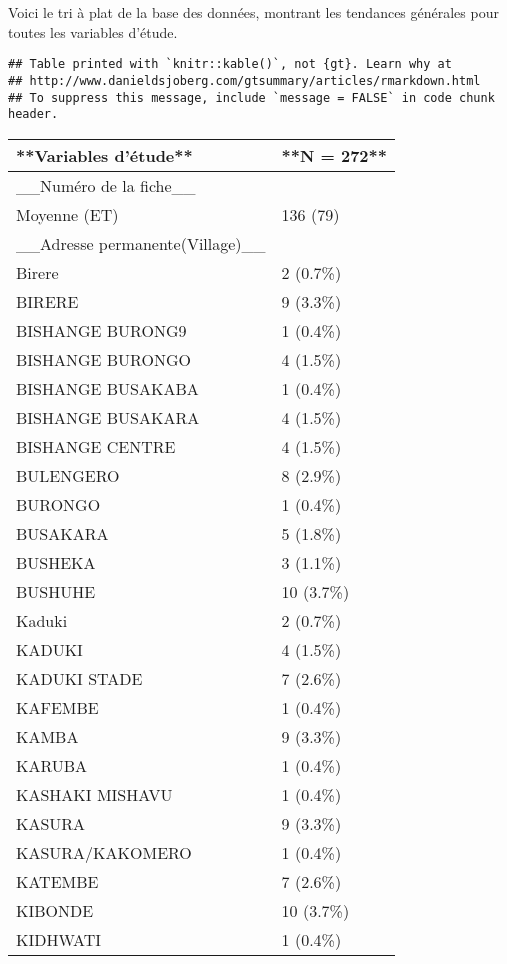 \documentclass[
]{book}
\begin{document}
Voici le tri à plat de la base des données, montrant les tendances générales pour toutes les variables d'étude.

\begin{verbatim}
## Table printed with `knitr::kable()`, not {gt}. Learn why at
## http://www.danieldsjoberg.com/gtsummary/articles/rmarkdown.html
## To suppress this message, include `message = FALSE` in code chunk header.
\end{verbatim}

\begin{tabular}{l|l}
\hline
**Variables d'étude** & **N = 272**\\
\hline
\_\_Numéro de la fiche\_\_ & \\
\hline
Moyenne  (ET) & 136  (79)\\
\hline
\_\_Adresse permanente(Village)\_\_ & \\
\hline
Birere & 2 (0.7\%)\\
\hline
BIRERE & 9 (3.3\%)\\
\hline
BISHANGE BURONG9 & 1 (0.4\%)\\
\hline
BISHANGE BURONGO & 4 (1.5\%)\\
\hline
BISHANGE BUSAKABA & 1 (0.4\%)\\
\hline
BISHANGE BUSAKARA & 4 (1.5\%)\\
\hline
BISHANGE CENTRE & 4 (1.5\%)\\
\hline
BULENGERO & 8 (2.9\%)\\
\hline
BURONGO & 1 (0.4\%)\\
\hline
BUSAKARA & 5 (1.8\%)\\
\hline
BUSHEKA & 3 (1.1\%)\\
\hline
BUSHUHE & 10 (3.7\%)\\
\hline
Kaduki & 2 (0.7\%)\\
\hline
KADUKI & 4 (1.5\%)\\
\hline
KADUKI STADE & 7 (2.6\%)\\
\hline
KAFEMBE & 1 (0.4\%)\\
\hline
KAMBA & 9 (3.3\%)\\
\hline
KARUBA & 1 (0.4\%)\\
\hline
KASHAKI MISHAVU & 1 (0.4\%)\\
\hline
KASURA & 9 (3.3\%)\\
\hline
KASURA/KAKOMERO & 1 (0.4\%)\\
\hline
KATEMBE & 7 (2.6\%)\\
\hline
KIBONDE & 10 (3.7\%)\\
\hline
KIDHWATI & 1 (0.4\%)\\

\end{tabular}
\end{document}
